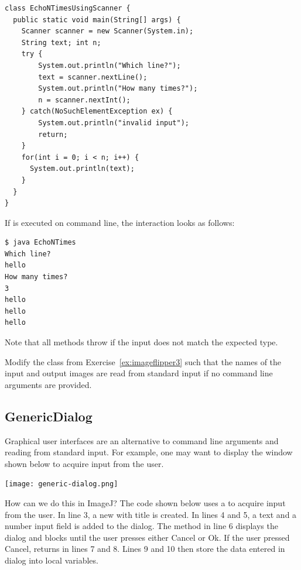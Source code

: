 \documentclass{book}
\begin{document}
\begin{lstlisting}
class EchoNTimesUsingScanner {
  public static void main(String[] args) {
    Scanner scanner = new Scanner(System.in);
    String text; int n;
    try {
    	System.out.println("Which line?");
    	text = scanner.nextLine();
    	System.out.println("How many times?");
    	n = scanner.nextInt();
    } catch(NoSuchElementException ex) {
    	System.out.println("invalid input");
    	return;
    }
    for(int i = 0; i < n; i++) {
      System.out.println(text);    
    }
  }
}
\end{lstlisting}

If  is executed on command line, the interaction looks as follows:

\begin{verbatim} 
$ java EchoNTimes
Which line?
hello
How many times?
3
hello
hello
hello
\end{verbatim}

Note that all  methods throw  if the input does not match the expected type.

\begin{exercise}\label{ex:imageflipper4}
Modify the class  from Exercise~\ref{ex:imageflipper3} such that the names of the input and output images are read from standard input if no command line arguments are provided.
\end{exercise}

\subsection{GenericDialog}
Graphical user interfaces are an alternative to command line arguments and reading from standard input. For example, one may want to display the window shown below to acquire input from the user.  

\begin{center}
\texttt{[image: generic-dialog.png]}
\end{center}

How can we do this in ImageJ? The code shown below uses a  to acquire input from the user. In line 3, a new  with title  is created. In lines 4 and 5, a text  and a number input field is added to the dialog. The method  in line 6 displays the dialog and blocks until the user presses either Cancel or Ok.  If the user pressed Cancel,  returns in lines 7 and 8. Lines 9 and 10 then store the data entered in dialog into local variables. 
\end{document}
